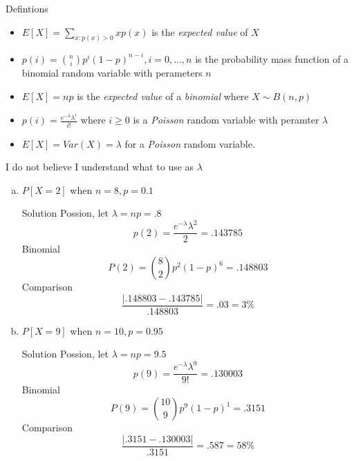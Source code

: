 \documentclass{article}
\begin{document}
\begin{spacing}{1.1}
\begin{homeworkProblem}
  \begin{homeworkSection}{Defintions}
    \begin{itemize}
      \item $E[ X] = \sum\limits_{x:p( x) > 0}{ x p( x)}$ is the 
      \emph{expected value} of $X$
      \item $p( i) = {n \choose i} p^i (1 - p)^{n - i}, i = 0, \dots, n$ is the
      probability mass function of a binomial random variable with perameters $n$
      \item $E[ X] = n p$ is the \emph{expected value} of a \emph{binomial}
      where $X \sim B( n, p)$
      \item $p( i) = \frac{ e^{-\lambda} \lambda^i}{ i!}$ where 
        $i \ge 0$ is a \emph{Poisson} random variable with peramter $\lambda$ 
      \item $E[ X] = Var( X) = \lambda$ for a \emph{Poisson} random variable.
    \end{itemize}
  \end{homeworkSection}
  I do not believe I understand what to use as $\lambda$
  \begin{enumerate}[(a)]
    \item $P[ X = 2]$ when $n = 8, p = 0.1$
      \begin{homeworkSection}{Solution}
        Possion, let $\lambda = np = .8$
         \[p(2) = \frac{ e^{-\lambda} \lambda^2}{ 2} = .143785\]
        Binomial
        \[P(2) = {8 \choose 2} p^2 (1 - p)^6 = .148803\]
        Comparison
        \[\frac{ |.148803 -.143785|}{ .148803} = .03 = 3\%\]
      \end{homeworkSection}
    \item $P[ X = 9]$ when $n = 10, p = 0.95$
      \begin{homeworkSection}{Solution}
        Possion, let $\lambda = np = 9.5$
         \[p(9) = \frac{ e^{-\lambda} \lambda^9}{ 9!} = .130003\]
        Binomial
        \[P(9) = {10 \choose 9} p^9 (1 - p)^1 = .3151\]
        Comparison
        \[\frac{|.3151 -.130003|}{.3151} = .587 = 58\%\]
      \end{homeworkSection}
  \end{enumerate}
\end{homeworkProblem}


\end{spacing}
\end{document}
